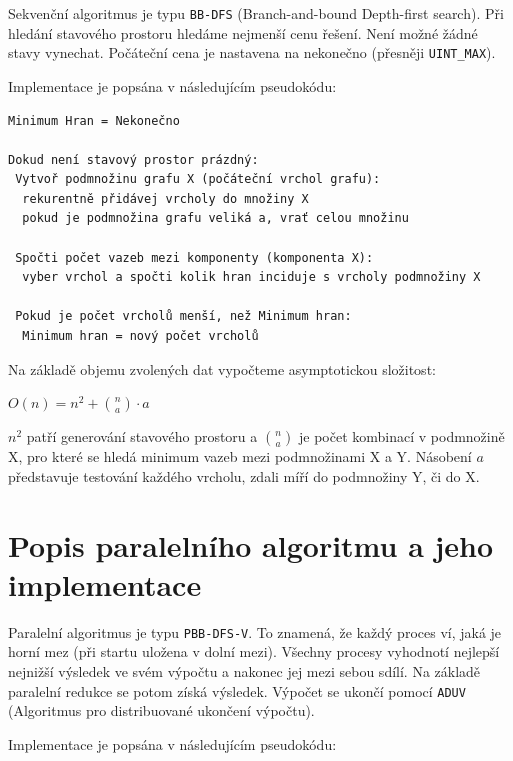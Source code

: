 \documentclass[a4paper,10pt]{report}
\begin{document}
Sekvenční algoritmus je typu \texttt{BB-DFS} (Branch-and-bound Depth-first search). Při hledání stavového prostoru hledáme nejmenší cenu řešení. Není možné žádné stavy vynechat. Počáteční cena je nastavena na nekonečno (přesněji \texttt{UINT\_MAX}).

Implementace je popsána v následujícím pseudokódu:

\begin{verbatim}
Minimum Hran = Nekonečno

Dokud není stavový prostor prázdný:
 Vytvoř podmnožinu grafu X (počáteční vrchol grafu):
  rekurentně přidávej vrcholy do množiny X
  pokud je podmnožina grafu veliká a, vrať celou množinu

 Spočti počet vazeb mezi komponenty (komponenta X):
  vyber vrchol a spočti kolik hran inciduje s vrcholy podmnožiny X
 
 Pokud je počet vrcholů menší, než Minimum hran:
  Minimum hran = nový počet vrcholů

\end{verbatim}

Na základě objemu zvolených dat vypočteme asymptotickou složitost: 

\hspace{1cm}

$O(n)=n^{2} + {n\choose a} \cdot a$

\hspace{1cm}

$n^2$ patří generování stavového prostoru a ${n\choose a}$ je počet kombinací v podmnožině X, pro které se hledá minimum vazeb mezi podmnožinami X a Y. Násobení $a$ představuje testování každého vrcholu, zdali míří do podmnožiny Y, či do X. 

\chapter{Popis paralelního algoritmu a jeho implementace}

Paralelní algoritmus je typu \texttt{PBB-DFS-V}. To znamená, že každý proces ví, jaká je horní mez (při startu uložena v dolní mezi). Všechny procesy vyhodnotí nejlepší nejnižší výsledek ve svém výpočtu a nakonec jej mezi sebou sdílí. Na základě paralelní redukce se potom získá výsledek. Výpočet se ukončí pomocí \texttt{ADUV} (Algoritmus pro distribuované ukončení výpočtu).

Implementace je popsána v následujícím pseudokódu:
\end{document}
